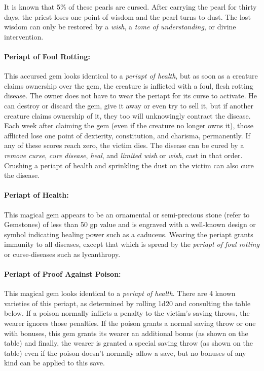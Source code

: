 \begin{multicols}{2}
It is known that 5\% of these pearls are cursed.  After carrying the pearl for thirty days, the priest loses one point of wisdom and the pearl turns to dust.  The lost wisdom can only be restored by a \textit{wish}, a \textit{tome of understanding}, or divine intervention.

\paragraph{Periapt of Foul Rotting:} This accursed gem looks identical to a \textit{periapt of health}, but as soon as a creature claims ownership over the gem, the creature is inflicted with a foul, flesh rotting disease.  The owner does not have to wear the periapt for its curse to activate.  He can destroy or discard the gem, give it away or even try to sell it, but if another creature claims ownership of it, they too will unknowingly contract the disease.  Each week after claiming the gem (even if the creature no longer owns it), those afflicted lose one point of dexterity, constitution, and charisma, permanently.  If any of these scores reach zero, the victim dies.  The disease can be cured by a \textit{remove curse}, \textit{cure disease}, \textit{heal}, and \textit{limited wish} or \textit{wish}, cast in that order.  Crushing a periapt of health and sprinkling the dust on the victim can also cure the disease.

\paragraph{Periapt of Health:} This magical gem appears to be an ornamental or semi-precious stone (refer to Gemstones) of less than 50 gp value and is engraved with a well-known design or symbol indicating healing power such as a caduceus.  Wearing the periapt grants immunity to all diseases, except that which is spread by the \textit{periapt of foul rotting} or curse-diseases such as lycanthropy.

\paragraph{Periapt of Proof Against Poison:} This magical gem looks identical to a \textit{periapt of health}.  There are 4 known varieties of this periapt, as determined by rolling 1d20 and consulting the table below.  If a poison normally inflicts a penalty to the victim's saving throws, the wearer ignores those penalties.  If the poison grants a normal saving throw or one with bonuses, this gem grants its wearer an additional bonus (as shown on the table) and finally, the wearer is granted a special saving throw (as shown on the table) even if the poison doesn't normally allow a save, but no bonuses of any kind can be applied to this save.


\end{multicols}
